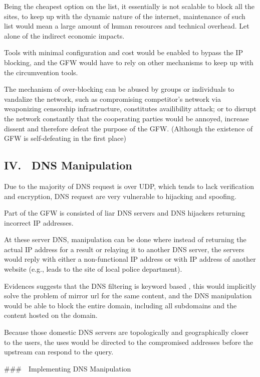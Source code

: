 \documentclass[sigconf]{acmart}
\begin{document}
Being the cheapest option on the list, it essentially is not scalable to
block all the sites, to keep up with the dynamic nature of the internet,
maintenance of such list would mean a large amount of human resources
and technical overhead. Let alone of the indirect economic impacts.

Tools with minimal configuration and cost would be enabled to bypass the
IP blocking, and the GFW would have to rely on other mechanisms to keep
up with the circumvention tools.

The mechanism of over-blocking can be abused by groups or individuals to
vandalize the network, such as compromising competitor's network via
weaponizing censorship infrastructure, constitutes availibility attack;
or to disrupt the network constantly that the cooperating parties would
be annoyed, increase dissent and therefore defeat the purpose of the
GFW. (Although the existence of GFW is self-defeating in the first
place)

\hypertarget{iv.-dns-manipulation}{%
\subsection{IV. DNS Manipulation}\label{iv.-dns-manipulation}}

Due to the majority of DNS request is over UDP, which tends to lack
verification and encryption, DNS request are very vulnerable to
hijacking and spoofing. \cite{20_dnsUDP}

Part of the GFW is consisted of liar DNS servers and DNS hijackers
returning incorrect IP addresses.

At these server DNS, manipulation can be done where instead of returning
the actual IP address for a result or relaying it to another DNS server,
the servers would reply with either a non-functional IP address or with
IP address of another website (e.g., leads to the site of local police
department).

Evidences suggests that the DNS filtering is keyword based
\cite{21_dnsCompreh} , this would implicitly solve the problem of mirror
url for the same content, and the DNS manipulation would be able to
block the entire domain, including all subdomains and the content hosted
on the domain.

Because those domestic DNS servers are topologically and geographically
closer to the users, the uses would be directed to the compromised
addresses before the upstream can respond to the query.

\#\#\# Implementing DNS Manipulation
\end{document}
